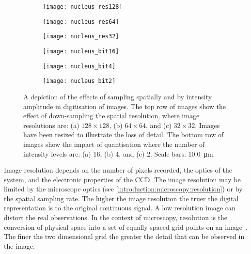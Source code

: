\begin{figure}[htbp!]\centering
	\begin{subfigure}[b]{0.32\linewidth}
		\centering
		\texttt{[image: nucleus\_res128]}
		\caption{}
		\label{figure:introduction:sampling:res128}
	\end{subfigure}
	\begin{subfigure}[b]{0.32\linewidth}
		\centering
		\texttt{[image: nucleus\_res64]}
		\caption{}
		\label{figure:introduction:sampling:res64}
	\end{subfigure}
	\begin{subfigure}[b]{0.32\linewidth}
		\centering
		\texttt{[image: nucleus\_res32]}
		\caption{}
		\label{figure:introduction:sampling:res32}
	\end{subfigure}
	\begin{subfigure}[b]{0.32\linewidth}
		\centering
		\texttt{[image: nucleus\_bit16]}
		\caption{}
		\label{figure:introduction:sampling:bit16}
	\end{subfigure}
	\begin{subfigure}[b]{0.32\linewidth}
		\centering
		\texttt{[image: nucleus\_bit4]}
		\caption{}
		\label{figure:introduction:sampling:bit4}
	\end{subfigure}
	\begin{subfigure}[b]{0.32\linewidth}
		\centering
		\texttt{[image: nucleus\_bit2]}
		\caption{}
		\label{figure:introduction:sampling:bit2}
	\end{subfigure}
\caption[Sampling in digitisation]{A depiction of the effects of sampling spatially and by intensity amplitude in digitisation of images. The top row of images show the effect of down-sampling the spatial resolution, where image resolutions are: (a) $128 \times 128$, (b) $64 \times 64$, and (c) $32 \times 32$. Images have been resized to illustrate the loss of detail. The bottom row of images show the impact of quantisation where the number of intensity levels are: (a) 16, (b) 4, and (c) 2. Scale bars: \SI{10.0}{\micro\meter}.}
\label{figure:introduction:sampling}
\end{figure}

Image resolution depends on the number of pixels recorded, the optics of the system, and the electronic properties of the CCD. The image resolution may be limited by the microscope optics (see \autoref{introduction:microscopy:resolution}) or by the spatial sampling rate. The higher the image resolution the truer the digital representation is to the original continuous signal. A low resolution image can distort the real observations. In the context of microscopy, resolution is the conversion of physical space into a set of equally spaced grid points on an image~\cite{Russ2006}. The finer the two dimensional grid the greater the detail that can be observed in the image.

